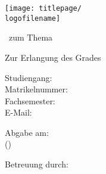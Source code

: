 
\begin{titlepage}

   \singlespacing

   \begin{center} \large 
    
    \universityname
    \vspace*{0.5cm}
    
    \facultyname
    \vspace*{1.5cm}
    
	\texttt{[image: titlepage/\\logofilename]}
    \vspace*{2cm} 

	\thesistype \ zum Thema
	\vspace*{0.5cm}
	
    {\huge\textbf{\thesistitle}}
    \vspace*{1.5cm}
    
    
  	Zur Erlangung des Grades \studygoal
  	\vspace*{1.5cm}

    \textbf{\thesisauthor}
    \vspace*{0.5cm}
    
    Studiengang: \studytype \\
    Matrikelnummer: \studentnumber \\
    Fachsemester: \semesternumber \\
    E-Mail: \mail \\
    \vspace*{2.0cm}

    Abgabe am: \submissiondate \\
    (\semester)
    \vspace*{1.5cm}

    Betreuung durch: \supervisor
  \end{center}
  
\end{titlepage}

\restoregeometry